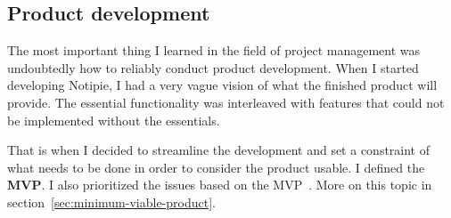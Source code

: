 \subsection{Product development}\label{sec:product-development}

The most important thing
I learned in the field of project management
was undoubtedly how to reliably conduct product development.
When I started developing Notipie,
I had a very vague vision
of what the finished product will provide.
The essential functionality was interleaved with features
that could not be implemented without the essentials.

That is when I decided to streamline the development
and set a constraint of what needs to be done
in order to consider the product usable.
I defined the \textbf{\acf{MVP}}.
I also prioritized the issues
based on the \ac{MVP}~\cite{sewera_issues_2022}.
More on this topic in section~\ref{sec:minimum-viable-product}.
